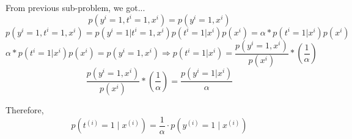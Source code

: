 \begin{answer}
From previous sub-problem, we got...
	\begin{equation*}
	    p(y^{i} = 1, t^{i} = 1, x^{i}) = p(y^{i} = 1, x^{i})
	\end{equation*}
	\begin{equation*}
	    p(y^{i} = 1, t^{i} = 1, x^{i}) = p(y^{i} = 1|t^{i} = 1,x^{i})p(t^{i} = 1|x^{i})p(x^{i}) = \alpha*p(t^{i} = 1|x^{i})p(x^{i})
	\end{equation*}
	\begin{equation*}
	    \alpha*p(t^{i} = 1|x^{i})p(x^{i}) =  p(y^{i} = 1, x^{i}) \Rightarrow p(t^{i} = 1|x^{i}) = \frac{p(y^{i} = 1, x^{i})}{p(x^{i})}*(\frac{1}{\alpha})
	\end{equation*}
	\begin{equation*}
	    \frac{p(y^{i} = 1, x^{i})}{p(x^{i})}*(\frac{1}{\alpha}) = \frac{p(y^{i} = 1|x^{i})}{\alpha}
	\end{equation*}
	
	Therefore, 
	\begin{equation*}
	p(t^{(i)} = 1\mid x^{(i)}) = \frac{1}{\alpha}\cdot p(y^{(i)} = 1\mid x^{(i)})\label{eqn:3} 
	\end{equation*}
	
\end{answer}
